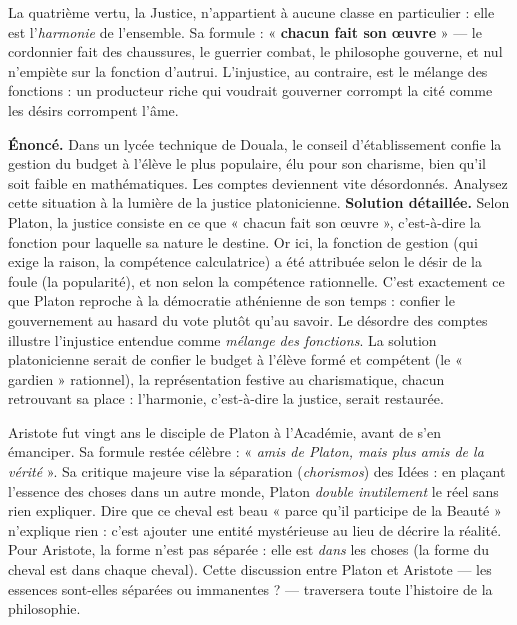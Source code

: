 \documentclass[11pt]{article}
\newcommand{\cle}[1]{{\popxbold\color{popdark}#1}}
\newcounter{popsec}
\newcounter{popsub}
\newcommand{\courssub}[1]{%
  \stepcounter{popsub}%
  \par\vspace{9pt}\noindent{\popxbold\fontsize{11.5}{13}\selectfont\color{popink}{\color{poporange}\thepopsec.\thepopsub}\hspace{6pt}#1}\par\nopagebreak\vspace{4pt}
}
\begin{document}
La quatrième vertu, la \cle{Justice}, n'appartient à aucune classe en particulier : elle est l'\emph{harmonie} de l'ensemble. Sa formule : « \textbf{chacun fait son œuvre} » — le cordonnier fait des chaussures, le guerrier combat, le philosophe gouverne, et nul n'empiète sur la fonction d'autrui. L'injustice, au contraire, est le mélange des fonctions : un producteur riche qui voudrait gouverner corrompt la cité comme les désirs corrompent l'âme.

\begin{exoresolu}
\textbf{Énoncé.} Dans un lycée technique de Douala, le conseil d'établissement confie la gestion du budget à l'élève le plus populaire, élu pour son charisme, bien qu'il soit faible en mathématiques. Les comptes deviennent vite désordonnés. Analysez cette situation à la lumière de la justice platonicienne.
\tcblower
\textbf{Solution détaillée.} Selon Platon, la justice consiste en ce que « chacun fait son œuvre », c'est-à-dire la fonction pour laquelle sa nature le destine. Or ici, la fonction de gestion (qui exige la raison, la compétence calculatrice) a été attribuée selon le désir de la foule (la popularité), et non selon la compétence rationnelle. C'est exactement ce que Platon reproche à la démocratie athénienne de son temps : confier le gouvernement au hasard du vote plutôt qu'au savoir. Le désordre des comptes illustre l'injustice entendue comme \emph{mélange des fonctions}. La solution platonicienne serait de confier le budget à l'élève formé et compétent (le « gardien » rationnel), la représentation festive au charismatique, chacun retrouvant sa place : l'harmonie, c'est-à-dire la justice, serait restaurée.
\end{exoresolu}

\courssub{Complément pour le Bac : la critique d'Aristote}

Aristote fut vingt ans le disciple de Platon à l'Académie, avant de s'en émanciper. Sa formule restée célèbre : « \emph{amis de Platon, mais plus amis de la vérité} ». Sa critique majeure vise la \cle{séparation} (\emph{chorismos}) des Idées : en plaçant l'essence des choses dans un autre monde, Platon \emph{double inutilement} le réel sans rien expliquer. Dire que ce cheval est beau « parce qu'il participe de la Beauté » n'explique rien : c'est ajouter une entité mystérieuse au lieu de décrire la réalité. Pour Aristote, la forme n'est pas séparée : elle est \emph{dans} les choses (la forme du cheval est dans chaque cheval). Cette discussion entre Platon et Aristote — les essences sont-elles séparées ou immanentes ? — traversera toute l'histoire de la philosophie.
\end{document}
